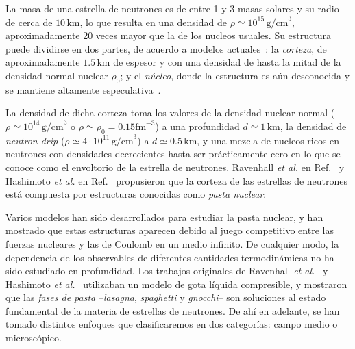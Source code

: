 La masa de una estrella de neutrones es de entre 1 y 3 masas solares y su radio de cerca de $10\,\text{km}$, lo que resulta en una densidad de $\rho \simeq 10^{15}\,\text{g/cm}^3$, aproximadamente 20 veces mayor que la de los nucleos usuales.
Su estructura puede dividirse en dos partes, de acuerdo a modelos actuales~\cite{page_minimal_2004, geppert_temperature_2004}: la \emph{corteza}, de aproximadamente $1.5\,\text{km}$ de espesor y con una densidad de hasta la mitad de la densidad normal nuclear $\rho_0$; y el \emph{núcleo}, donde la estructura es aún desconocida y se mantiene altamente especulativa~\cite{akmal_equation_1998, ravenhall_structure_1983, oyamatsu_nuclear_1993, woosley_physics_2005}.

La densidad de dicha corteza toma los valores de la densidad nuclear normal ($\rho \simeq 10^{14}\,\text{g/cm}^3$ o $ \rho \simeq \rho_0=0.15 \text{fm}^{-3}$) a una profundidad $d \simeq 1\,\text{km}$, la densidad de \emph{neutron drip} ($\rho\simeq 4 \cdot 10^{11}\,\text{g/cm}^3$) a $d\simeq 0.5\,\text{km}$, y una mezcla de nucleos ricos en neutrones con densidades decrecientes hasta ser prácticamente cero en lo que se conoce como el envoltorio de la estrella de neutrones.
Ravenhall \emph{et al.} en Ref.~\cite{ravenhall_structure_1983} y Hashimoto \emph{et al.} en Ref.~\cite{hashimoto_shape_1984} propusieron que la corteza de las estrellas de neutrones está compuesta por estructuras conocidas como \emph{pasta nuclear}.

Varios modelos han sido desarrollados para estudiar la pasta nuclear, y han mostrado que estas estructuras aparecen debido al juego competitivo entre las fuerzas nucleares y las de Coulomb en un medio infinito.
De cualquier modo, la dependencia de los observables de diferentes cantidades termodinámicas no ha sido estudiado en profundidad.
Los trabajos originales de Ravenhall \emph{et al.}~\cite{ravenhall_structure_1983} y Hashimoto \emph{et al.}~\cite{hashimoto_shape_1984} utilizaban un modelo de gota líquida compresible, y mostraron que las \emph{fases de pasta}
--\emph{lasagna}, \emph{spaghetti} y \emph{gnocchi}-- son soluciones al estado fundamental de la materia de estrellas de neutrones.
De ahí en adelante, se han tomado distintos enfoques que clasificaremos en dos categorías: campo medio o microscópico.

